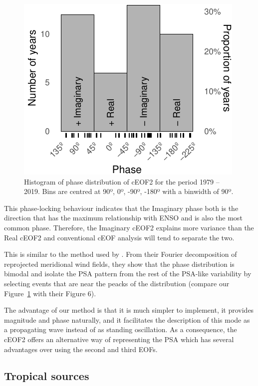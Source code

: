 \documentclass[smallextended]{svjour3}       %
\begin{document}
\begin{figure}
\centering
\includegraphics{../figures/phase-histogram-1.pdf}
\caption{\label{fig:phase-histogram}Histogram of phase distribution of cEOF2 for the period 1979 -- 2019. Bins are centred at 90º, 0º, -90º, -180º with a binwidth of 90º.}
\end{figure}

This phase-locking behaviour indicates that the Imaginary phase both is the direction that has the maximum relationship with ENSO and is also the most common phase. Therefore, the Imaginary cEOF2 explains more variance than the Real cEOF2 and conventional cEOF analysis will tend to separate the two.

This is similar to the method used by \citet{irving2016}. From their Fourier decomposition of reprojected meridional wind fields, they show that the phase distribution is bimodal and isolate the PSA pattern from the rest of the PSA-like variability by selecting events that are near the peacks of the distribution (compare our Figure~\ref{fig:phase-histogram} with their Figure 6).

The advantage of our method is that it is much simpler to implement, it provides magnitude and phase naturally, and it facilitates the description of this mode as a propagating wave instead of as standing oscillation. As a consequence, the cEOF2 offers an alternative way of representing the PSA which has several advantages over using the second and third EOFs.

\hypertarget{tropical-sources}{%
\subsection{Tropical sources}\label{tropical-sources}}
\end{document}

